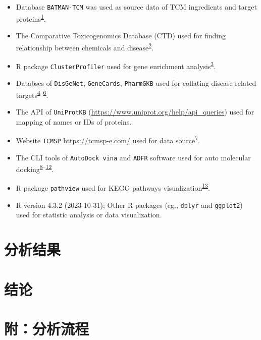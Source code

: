 \documentclass[
]{article}
\providecommand{\tightlist}{%
  \setlength{\itemsep}{0pt}\setlength{\parskip}{0pt}}
\begin{document}
\begin{itemize}
\tightlist
\item
  Database \texttt{BATMAN-TCM} was used as source data of TCM ingredients and target proteins\textsuperscript{\protect\hyperlink{ref-BatmanTcm20Kong2024}{1}}.
\item
  The Comparative Toxicogenomics Database (CTD) used for finding relationship between chemicals and disease\textsuperscript{\protect\hyperlink{ref-ComparativeToxDavis2023}{2}}.
\item
  R package \texttt{ClusterProfiler} used for gene enrichment analysis\textsuperscript{\protect\hyperlink{ref-ClusterprofilerWuTi2021}{3}}.
\item
  Databses of \texttt{DisGeNet}, \texttt{GeneCards}, \texttt{PharmGKB} used for collating disease related targets\textsuperscript{\protect\hyperlink{ref-TheDisgenetKnPinero2019}{4}--\protect\hyperlink{ref-PharmgkbAWorBarbar2018}{6}}.
\item
  The API of \texttt{UniProtKB} (\url{https://www.uniprot.org/help/api_queries}) used for mapping of names or IDs of proteins.
\item
  Website \texttt{TCMSP} \url{https://tcmsp-e.com/} used for data source\textsuperscript{\protect\hyperlink{ref-TcmspADatabaRuJi2014}{7}}.
\item
  The CLI tools of \texttt{AutoDock\ vina} and \texttt{ADFR} software used for auto molecular docking\textsuperscript{\protect\hyperlink{ref-AutodockVina1Eberha2021}{8}--\protect\hyperlink{ref-AutodockfrAdvRavind2015}{12}}.
\item
  R package \texttt{pathview} used for KEGG pathways visualization\textsuperscript{\protect\hyperlink{ref-PathviewAnRLuoW2013}{13}}.
\item
  R version 4.3.2 (2023-10-31); Other R packages (eg., \texttt{dplyr} and \texttt{ggplot2}) used for statistic analysis or data visualization.
\end{itemize}

\hypertarget{results}{%
\section{分析结果}\label{results}}

\hypertarget{dis}{%
\section{结论}\label{dis}}

\hypertarget{workflow}{%
\section{附：分析流程}\label{workflow}}
\end{document}
